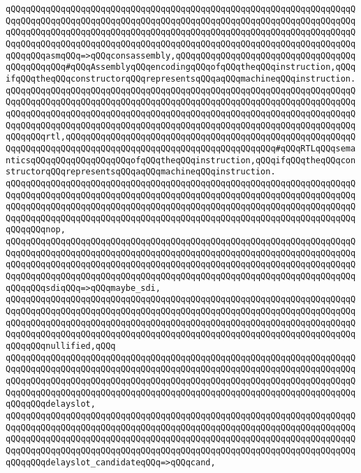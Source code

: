 \verb|qQQqqQQqqQQqqQQqqQQqqQQqqQQqqQQqqQQqqQQqqQQqqQQqqQQqqQQqqQQqqQQqqQQqqQQqqQQqqQQqqQQqqQQqqQQqqQQqqQQqqQQqqQQqqQQqqQQqqQQqqQQqqQQqqQQqqQQqqQQqqQQqqQQqqQQqqQQqqQQqqQQqqQQqqQQqqQQqqQQqqQQqqQQqqQQqqQQqqQQqqQQqqQQqqQQqqQQqqQQqqQQqqQQqqQQqqQQqqQQqqQQqqQQqqQQqqQQqqQQqqQQqqQQqqQQqqQQqqQQqqQQqqQQqasmqQQq=>qQQqconsassembly,qQQqqQQqqQQqqQQqqQQqqQQqqQQqqQQqqQQqqQQqqQQqqQQq#qQQqAssemblyqQQqencodingqQQqofqQQqtheqQQqinstruction,qQQqifqQQqtheqQQqconstructorqQQqrepresentsqQQqaqQQqmachineqQQqinstruction.|\newline
\verb|qQQqqQQqqQQqqQQqqQQqqQQqqQQqqQQqqQQqqQQqqQQqqQQqqQQqqQQqqQQqqQQqqQQqqQQqqQQqqQQqqQQqqQQqqQQqqQQqqQQqqQQqqQQqqQQqqQQqqQQqqQQqqQQqqQQqqQQqqQQqqQQqqQQqqQQqqQQqqQQqqQQqqQQqqQQqqQQqqQQqqQQqqQQqqQQqqQQqqQQqqQQqqQQqqQQqqQQqqQQqqQQqqQQqqQQqqQQqqQQqqQQqqQQqqQQqqQQqqQQqqQQqqQQqqQQqqQQqqQQqqQQqqQQqrtl,qQQqqQQqqQQqqQQqqQQqqQQqqQQqqQQqqQQqqQQqqQQqqQQqqQQqqQQqqQQqqQQqqQQqqQQqqQQqqQQqqQQqqQQqqQQqqQQqqQQqqQQqqQQqqQQq#qQQqRTLqQQqsemanticsqQQqqQQqqQQqqQQqqQQqofqQQqtheqQQqinstruction,qQQqifqQQqtheqQQqconstructorqQQqrepresentsqQQqaqQQqmachineqQQqinstruction.|\newline
\verb|qQQqqQQqqQQqqQQqqQQqqQQqqQQqqQQqqQQqqQQqqQQqqQQqqQQqqQQqqQQqqQQqqQQqqQQqqQQqqQQqqQQqqQQqqQQqqQQqqQQqqQQqqQQqqQQqqQQqqQQqqQQqqQQqqQQqqQQqqQQqqQQqqQQqqQQqqQQqqQQqqQQqqQQqqQQqqQQqqQQqqQQqqQQqqQQqqQQqqQQqqQQqqQQqqQQqqQQqqQQqqQQqqQQqqQQqqQQqqQQqqQQqqQQqqQQqqQQqqQQqqQQqqQQqqQQqqQQqqQQqqQQqqQQqnop,|\newline
\verb|qQQqqQQqqQQqqQQqqQQqqQQqqQQqqQQqqQQqqQQqqQQqqQQqqQQqqQQqqQQqqQQqqQQqqQQqqQQqqQQqqQQqqQQqqQQqqQQqqQQqqQQqqQQqqQQqqQQqqQQqqQQqqQQqqQQqqQQqqQQqqQQqqQQqqQQqqQQqqQQqqQQqqQQqqQQqqQQqqQQqqQQqqQQqqQQqqQQqqQQqqQQqqQQqqQQqqQQqqQQqqQQqqQQqqQQqqQQqqQQqqQQqqQQqqQQqqQQqqQQqqQQqqQQqqQQqqQQqqQQqqQQqqQQqsdiqQQq=>qQQqmaybe_sdi,|\newline
\verb|qQQqqQQqqQQqqQQqqQQqqQQqqQQqqQQqqQQqqQQqqQQqqQQqqQQqqQQqqQQqqQQqqQQqqQQqqQQqqQQqqQQqqQQqqQQqqQQqqQQqqQQqqQQqqQQqqQQqqQQqqQQqqQQqqQQqqQQqqQQqqQQqqQQqqQQqqQQqqQQqqQQqqQQqqQQqqQQqqQQqqQQqqQQqqQQqqQQqqQQqqQQqqQQqqQQqqQQqqQQqqQQqqQQqqQQqqQQqqQQqqQQqqQQqqQQqqQQqqQQqqQQqqQQqqQQqqQQqqQQqqQQqqQQqnullified,qQQq|\newline
\verb|qQQqqQQqqQQqqQQqqQQqqQQqqQQqqQQqqQQqqQQqqQQqqQQqqQQqqQQqqQQqqQQqqQQqqQQqqQQqqQQqqQQqqQQqqQQqqQQqqQQqqQQqqQQqqQQqqQQqqQQqqQQqqQQqqQQqqQQqqQQqqQQqqQQqqQQqqQQqqQQqqQQqqQQqqQQqqQQqqQQqqQQqqQQqqQQqqQQqqQQqqQQqqQQqqQQqqQQqqQQqqQQqqQQqqQQqqQQqqQQqqQQqqQQqqQQqqQQqqQQqqQQqqQQqqQQqqQQqqQQqqQQqqQQqdelayslot,|\newline
\verb|qQQqqQQqqQQqqQQqqQQqqQQqqQQqqQQqqQQqqQQqqQQqqQQqqQQqqQQqqQQqqQQqqQQqqQQqqQQqqQQqqQQqqQQqqQQqqQQqqQQqqQQqqQQqqQQqqQQqqQQqqQQqqQQqqQQqqQQqqQQqqQQqqQQqqQQqqQQqqQQqqQQqqQQqqQQqqQQqqQQqqQQqqQQqqQQqqQQqqQQqqQQqqQQqqQQqqQQqqQQqqQQqqQQqqQQqqQQqqQQqqQQqqQQqqQQqqQQqqQQqqQQqqQQqqQQqqQQqqQQqqQQqqQQqdelayslot_candidateqQQq=>qQQqcand,|\newline
